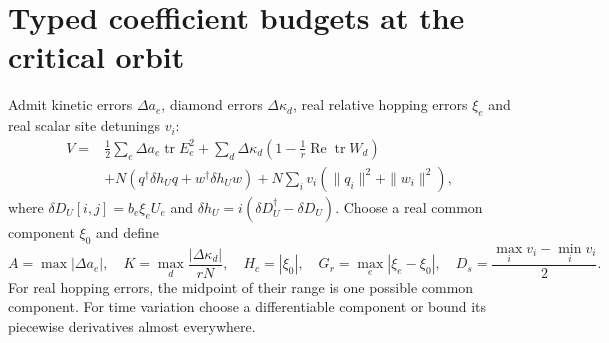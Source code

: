 \documentclass[11pt,a4paper]{article}
\newcommand{\tr}{\operatorname{tr}}\newcommand{\diag}{\operatorname{diag}}\newcommand{\Rea}{\operatorname{Re}}\newcommand{\grad}{\operatorname{grad}}
\begin{document}
\section{Typed coefficient budgets at the critical orbit}
Admit kinetic errors $\Delta a_e$, diamond errors $\Delta\kappa_d$, real relative hopping errors $\xi_e$ and real scalar site detunings $v_i$:
\begin{align*}
V={}&\frac12\sum_e\Delta a_e\tr E_e^2
+\sum_d\Delta\kappa_d\left(1-\frac1r\Rea\tr W_d\right)\\
&+N(q^\dagger\delta h_Uq+w^\dagger\delta h_Uw)
+N\sum_i v_i(\|q_i\|^2+\|w_i\|^2),
\end{align*}
where $\delta D_U[i,j]=b_e\xi_eU_e$ and $\delta h_U=i(\delta D_U^\dagger-\delta D_U)$. Choose a real common component $\xi_0$ and define
\[
A=\max|\Delta a_e|,\quad K=\max_d\frac{|\Delta\kappa_d|}{rN},\quad
H_c=|\xi_0|,\quad G_r=\max_e|\xi_e-\xi_0|,\quad
D_s=\frac{\max_i v_i-\min_i v_i}{2}.
\]
For real hopping errors, the midpoint of their range is one possible common component. For time variation choose a differentiable component or bound its piecewise derivatives almost everywhere.
\end{document}
